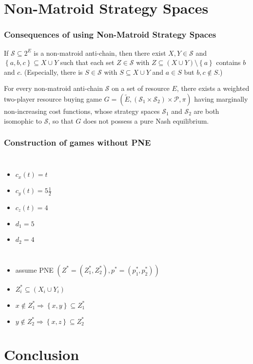 \documentclass{beamer}
\newcommand{\tupel}[1]{\left(#1\right)}
\newcommand{\set}[1]{\left\{#1\right\}}
\begin{document}
\section{Non-Matroid Strategy Spaces}
\begin{frame}
\frametitle{Consequences of using Non-Matroid Strategy Spaces}
  \begin{lemma}
    If $\mathcal{S}\subseteq 2^{E}$ is a non-matroid anti-chain, then there
    exist $X,Y\in\mathcal{S}$ and $\set{a,b,c}\subseteq X\cup Y$ such that each
    set $Z\in\mathcal{S}$ with $Z\subseteq(X\cup Y)\setminus\set{a}$ contains
    $b$ and $c$. (Especially, there is $S\in\mathcal{S}$ with
    $S\subseteq X\cup Y$ and $a\in S$ but $b,c\notin S$.)
  \end{lemma}
  \begin{theorem}
    For every non-matroid anti-chain $\mathcal{S}$ on a set of resource $E$,
    there exists a weighted two-player resource buying game
    $G = \tupel{\tilde{E}, \tupel{\mathcal{S}_{1} \times
    \mathcal{S}_{2}}\times \mathcal{P}, \pi}$ having marginally non-increasing
    cost functions, whose strategy spaces $\mathcal{S}_{1}$ and
    $\mathcal{S}_{2}$ are both isomophic to $\mathcal{S}$, so that $G$ does not
    possess a pure Nash equilibrium.
  \end{theorem}
\end{frame}

\begin{frame}
  \frametitle{Construction of games without PNE}
   \begin{columns}
       \begin{itemize}
         \item $c_{x}(t) = t$
         \item $c_{y}(t) = 5\frac{1}{2}$
         \item $c_{z}(t) = 4$
         \item $d_{1} = 5$
         \item $d_{2} = 4$
       \end{itemize}
       \begin{center}
         \resizebox{\textwidth}{!}{}
       \end{center}
   \end{columns}
   \begin{itemize}
     \item assume PNE $\tupel{Z^{\ast} = \tupel{Z_{1}^{\ast}, Z_{2}^{\ast}},
       p^{\ast} = \tupel{p_{1}^{\ast}, p_{2}^{\ast}}}$
     \item $Z_{i}^{\ast}\subseteq\tupel{X_{i}\cup Y_{i}}$
     \item $x\not\in Z_{1}^{\ast}\Rightarrow \set{x,y}\subseteq Z_{1}^{\ast}$
     \item $y\not\in Z_{2}^{\ast}\Rightarrow \set{x,z}\subseteq Z_{2}^{\ast}$
   \end{itemize}
\end{frame}

\section{Conclusion}
\begin{frame}
\end{frame}
\end{document}
